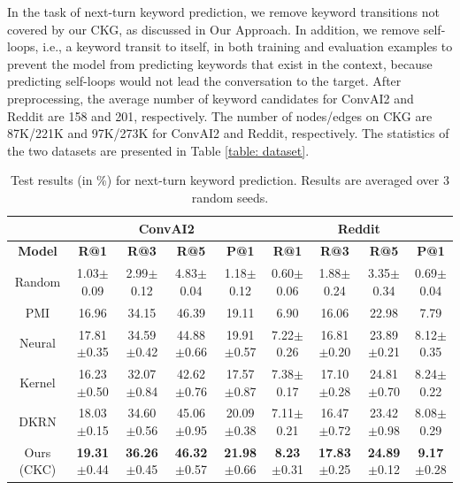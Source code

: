 \documentclass[letterpaper]{article} %
\begin{document}
In the task of next-turn keyword prediction, we remove keyword transitions not covered by our CKG, as discussed in Our Approach. In addition, we remove self-loops, i.e., a keyword transit to itself, in both training and evaluation examples to prevent the model from predicting keywords that exist in the context, because predicting self-loops would not lead the conversation to the target. After preprocessing, the average number of keyword candidates for ConvAI2 and Reddit are 158 and 201, respectively. The number of nodes/edges on CKG are 87K/221K and 97K/273K for ConvAI2 and Reddit, respectively. The statistics of the two datasets are presented in Table \ref{table: dataset}.
\begin{table}[!t]
\small
\centering
\begin{tabular}{c|cccc|cccc}
\hline
&\multicolumn{4}{c|}{\textbf{ConvAI2}}&\multicolumn{4}{c}{\textbf{Reddit}}\\
\hline
\textbf{Model} & \textbf{R@1} & \textbf{R@3} & \textbf{R@5} & \textbf{P@1} & \textbf{R@1} & \textbf{R@3} & \textbf{R@5} & \textbf{P@1}\\
\hline
Random & 1.03$\pm$0.09 & 2.99$\pm$0.12 & 4.83$\pm$0.04 & 1.18$\pm$0.12 & 0.60$\pm$0.06 & 1.88$\pm$0.24 & 3.35$\pm$0.34 & 0.69$\pm$0.04\\

PMI & 16.96 & 34.15 & 46.39 & 19.11 & 6.90 & 16.06 & 22.98 & 7.79\\

Neural & 17.81$\pm$0.35 & 34.59$\pm$0.42 & 44.88$\pm$0.66 & 19.91$\pm$0.57 & 7.22$\pm$0.26 & 16.81$\pm$0.20 & 23.89$\pm$0.21 & 8.12$\pm$0.35\\

Kernel & 16.23$\pm$0.50 & 32.07$\pm$0.84 & 42.62$\pm$0.76 & 17.57$\pm$0.87 & 7.38$\pm$0.17 & 17.10$\pm$0.28 & 24.81$\pm$0.70 & 8.24$\pm$0.22\\

DKRN & 18.03$\pm$0.15 & 34.60$\pm$0.56 & 45.06$\pm$0.95 & 20.09$\pm$0.38 & 7.11$\pm$0.21 & 16.47$\pm$0.72 & 23.42$\pm$0.98 & 8.08$\pm$0.29\\
\hline

Ours (CKC) & \textbf{19.31}$\pm$0.44 & \textbf{36.26}$\pm$0.45 & \textbf{46.32}$\pm$0.57 & \textbf{21.98}$\pm$0.66 & \textbf{8.23}$\pm$0.31 & \textbf{17.83}$\pm$0.25 & \textbf{24.89}$\pm$0.12 & \textbf{9.17}$\pm$0.28\\
\hline
\end{tabular}
\caption{Test results (in \%) for next-turn keyword prediction. Results are averaged over 3 random seeds.}
\label{table: next-turn keyword prediction}
\end{table}
\end{document}
